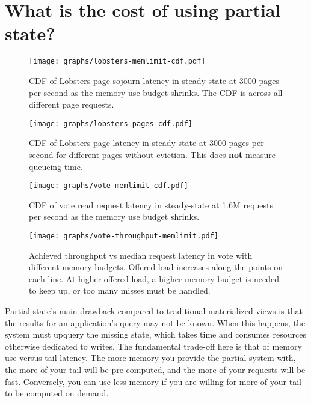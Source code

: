 \section{What is the cost of using partial state?}
\label{s:eval:cost}

\begin{figure}[h]
  \centering
  \texttt{[image: graphs/lobsters-memlimit-cdf.pdf]}
  \caption{CDF of Lobsters page sojourn latency in steady-state at 3000 pages
  per second as the memory use budget shrinks. The CDF is across all different
  page requests.}
  \label{f:lobsters-mem-latency}
\end{figure}

\begin{figure}[h]
  \centering
  \texttt{[image: graphs/lobsters-pages-cdf.pdf]}
  \caption{CDF of Lobsters page latency in steady-state at 3000 pages per second
  for different pages without eviction. This does \textbf{not} measure queueing
  time.}
  \label{f:lobsters-pages-latency}
\end{figure}

\begin{figure}[h]
  \centering
  \texttt{[image: graphs/vote-memlimit-cdf.pdf]}
  \caption{CDF of vote read request latency in steady-state at 1.6M requests per
  second as the memory use budget shrinks.}
  \label{f:vote-mem-latency}
\end{figure}

\begin{figure}[h]
  \centering
  \texttt{[image: graphs/vote-throughput-memlimit.pdf]}
  \caption{Achieved throughput vs median request latency in vote with
  different memory budgets. Offered load increases along the points on each
  line. At higher offered load, a higher memory budget is needed to keep up, or
  too many misses must be handled.}
  \label{f:vote-throughput-memlimit}
\end{figure}

Partial state's main drawback compared to traditional materialized views is
that the results for an application's query may not be known. When this happens,
the system must upquery the missing state, which takes time and consumes
resources otherwise dedicated to writes. The fundamental trade-off here is that
of memory use versus tail latency. The more memory you provide the partial
system with, the more of your tail will be pre-computed, and the more of your
requests will be fast. Conversely, you can use less memory if you are willing
for more of your tail to be computed on demand.

